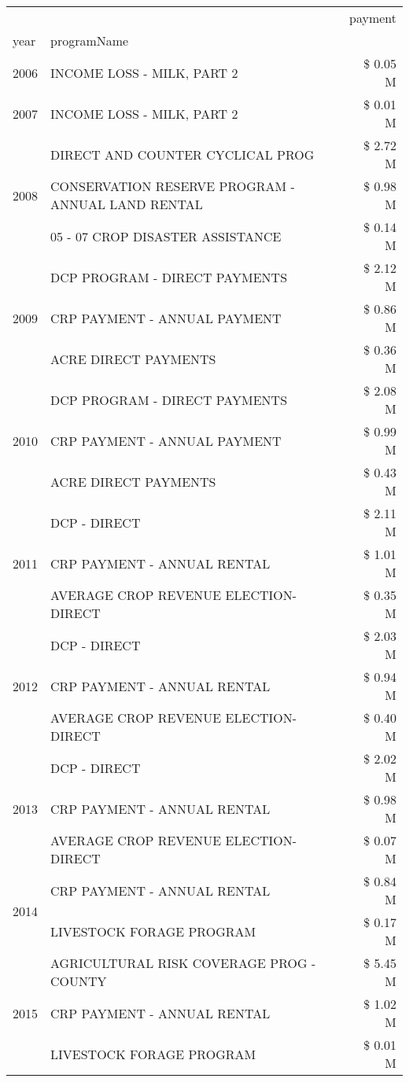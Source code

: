 \begin{tabular}{llr}
\toprule
 &  & payment \\
year & programName &  \\
\midrule
2006 & INCOME LOSS - MILK, PART 2 & \$ 0.05 M \\
\cline{1-3}
2007 & INCOME LOSS - MILK, PART 2 & \$ 0.01 M \\
\cline{1-3}
\multirow[t]{3}{*}{2008} & DIRECT AND COUNTER CYCLICAL PROG & \$ 2.72 M \\
 & CONSERVATION RESERVE PROGRAM - ANNUAL LAND RENTAL & \$ 0.98 M \\
 & 05 - 07 CROP DISASTER ASSISTANCE & \$ 0.14 M \\
\cline{1-3}
\multirow[t]{3}{*}{2009} & DCP PROGRAM - DIRECT PAYMENTS & \$ 2.12 M \\
 & CRP PAYMENT - ANNUAL PAYMENT & \$ 0.86 M \\
 & ACRE DIRECT PAYMENTS & \$ 0.36 M \\
\cline{1-3}
\multirow[t]{3}{*}{2010} & DCP PROGRAM - DIRECT PAYMENTS & \$ 2.08 M \\
 & CRP PAYMENT - ANNUAL PAYMENT & \$ 0.99 M \\
 & ACRE DIRECT PAYMENTS & \$ 0.43 M \\
\cline{1-3}
\multirow[t]{3}{*}{2011} & DCP - DIRECT & \$ 2.11 M \\
 & CRP PAYMENT - ANNUAL RENTAL & \$ 1.01 M \\
 & AVERAGE CROP REVENUE ELECTION-DIRECT & \$ 0.35 M \\
\cline{1-3}
\multirow[t]{3}{*}{2012} & DCP - DIRECT & \$ 2.03 M \\
 & CRP PAYMENT - ANNUAL RENTAL & \$ 0.94 M \\
 & AVERAGE CROP REVENUE ELECTION-DIRECT & \$ 0.40 M \\
\cline{1-3}
\multirow[t]{3}{*}{2013} & DCP - DIRECT & \$ 2.02 M \\
 & CRP PAYMENT - ANNUAL RENTAL & \$ 0.98 M \\
 & AVERAGE CROP REVENUE ELECTION-DIRECT & \$ 0.07 M \\
\cline{1-3}
\multirow[t]{2}{*}{2014} & CRP PAYMENT - ANNUAL RENTAL & \$ 0.84 M \\
 & LIVESTOCK FORAGE PROGRAM & \$ 0.17 M \\
\cline{1-3}
\multirow[t]{3}{*}{2015} & AGRICULTURAL RISK COVERAGE PROG - COUNTY & \$ 5.45 M \\
 & CRP PAYMENT - ANNUAL RENTAL & \$ 1.02 M \\
 & LIVESTOCK FORAGE PROGRAM & \$ 0.01 M \\

\end{tabular}

